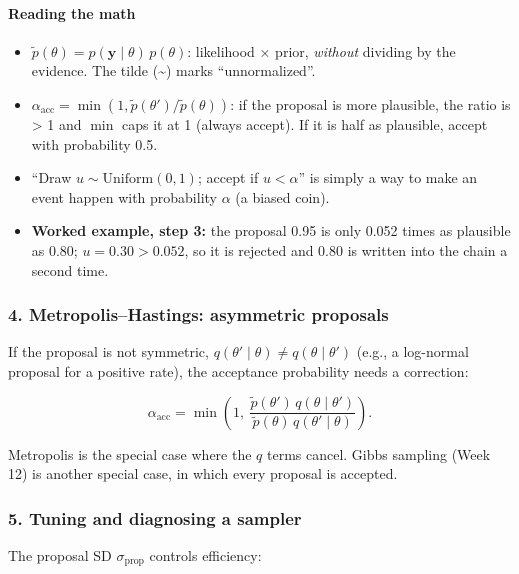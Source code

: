 \paragraph{Reading the math}

\begin{itemize}
\tightlist
\item
  \(\tilde p(\theta) = p(\mathbf{y}\mid\theta)\,p(\theta)\): likelihood
  × prior, \emph{without} dividing by the evidence. The tilde
  (\textasciitilde) marks ``unnormalized''.
\item
  \(\alpha_{\text{acc}} = \min(1, \tilde p(\theta')/\tilde p(\theta))\):
  if the proposal is more plausible, the ratio is \textgreater{} 1 and
  \(\min\) caps it at 1 (always accept). If it is half as plausible,
  accept with probability 0.5.
\item
  ``Draw \(u \sim \mathrm{Uniform}(0,1)\); accept if \(u < \alpha\)'' is
  simply a way to make an event happen with probability \(\alpha\) (a
  biased coin).
\item
  \textbf{Worked example, step 3:} the proposal 0.95 is only 0.052 times
  as plausible as 0.80; \(u = 0.30 > 0.052\), so it is rejected and 0.80
  is written into the chain a second time.
\end{itemize}

\subsubsection{4. Metropolis--Hastings: asymmetric proposals}

If the proposal is not symmetric,
\(q(\theta'\mid\theta) \ne q(\theta\mid\theta')\) (e.g., a log-normal
proposal for a positive rate), the acceptance probability needs a
correction:

\[
\alpha_{\text{acc}} = \min\left(1,\ \frac{\tilde p(\theta')\, q(\theta \mid \theta')}{\tilde p(\theta)\, q(\theta' \mid \theta)}\right).
\]

Metropolis is the special case where the \(q\) terms cancel. Gibbs
sampling (Week 12) is another special case, in which every proposal is
accepted.

\subsubsection{5. Tuning and diagnosing a sampler}

The proposal SD \(\sigma_{\text{prop}}\) controls efficiency:

